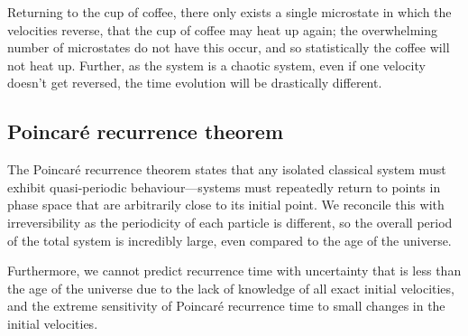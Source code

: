 Returning to the cup of coffee, there only exists a single microstate in which the velocities reverse, that the cup of coffee may heat up again; the overwhelming number of microstates do not have this occur, and so statistically the coffee will not heat up. Further, as the system is a chaotic system, even if one velocity doesn't get reversed, the time evolution will be drastically different.

\subsection{Poincar\'e recurrence theorem}
The Poincar\'e recurrence theorem states that any isolated classical system must exhibit quasi-periodic behaviour---systems must repeatedly return to points in phase space that are arbitrarily close to its initial point. We reconcile this with irreversibility as the periodicity of each particle is different, so the overall period of the total system is incredibly large, even compared to the age of the universe. 

Furthermore, we cannot predict recurrence time with uncertainty that is less than the age of the universe due to the lack of knowledge of all exact initial velocities, and the extreme sensitivity of Poincar\'e recurrence time to small changes in the initial velocities.
